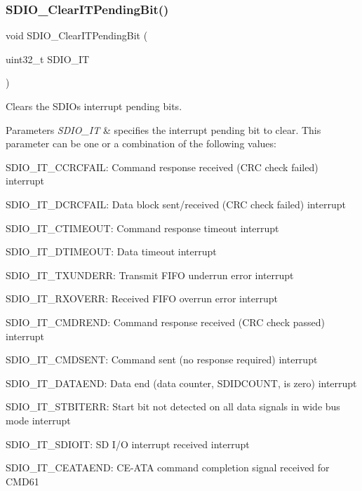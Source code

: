 \subsubsection{\texorpdfstring{SDIO\_ClearITPendingBit()}{SDIO\_ClearITPendingBit()}}
{\footnotesize\ttfamily void S\+D\+I\+O\+\_\+\+Clear\+I\+T\+Pending\+Bit (\begin{DoxyParamCaption}\item[{uint32\+\_\+t}]{S\+D\+I\+O\+\_\+\+IT }\end{DoxyParamCaption})}



Clears the S\+D\+IO\textquotesingle{}s interrupt pending bits. 


\begin{DoxyParams}{Parameters}
{\em S\+D\+I\+O\+\_\+\+IT} & specifies the interrupt pending bit to clear. This parameter can be one or a combination of the following values\+: \begin{DoxyItemize}
\item S\+D\+I\+O\+\_\+\+I\+T\+\_\+\+C\+C\+R\+C\+F\+A\+IL\+: Command response received (C\+RC check failed) interrupt \item S\+D\+I\+O\+\_\+\+I\+T\+\_\+\+D\+C\+R\+C\+F\+A\+IL\+: Data block sent/received (C\+RC check failed) interrupt \item S\+D\+I\+O\+\_\+\+I\+T\+\_\+\+C\+T\+I\+M\+E\+O\+UT\+: Command response timeout interrupt \item S\+D\+I\+O\+\_\+\+I\+T\+\_\+\+D\+T\+I\+M\+E\+O\+UT\+: Data timeout interrupt \item S\+D\+I\+O\+\_\+\+I\+T\+\_\+\+T\+X\+U\+N\+D\+E\+RR\+: Transmit F\+I\+FO underrun error interrupt \item S\+D\+I\+O\+\_\+\+I\+T\+\_\+\+R\+X\+O\+V\+E\+RR\+: Received F\+I\+FO overrun error interrupt \item S\+D\+I\+O\+\_\+\+I\+T\+\_\+\+C\+M\+D\+R\+E\+ND\+: Command response received (C\+RC check passed) interrupt \item S\+D\+I\+O\+\_\+\+I\+T\+\_\+\+C\+M\+D\+S\+E\+NT\+: Command sent (no response required) interrupt \item S\+D\+I\+O\+\_\+\+I\+T\+\_\+\+D\+A\+T\+A\+E\+ND\+: Data end (data counter, S\+D\+I\+D\+C\+O\+U\+NT, is zero) interrupt \item S\+D\+I\+O\+\_\+\+I\+T\+\_\+\+S\+T\+B\+I\+T\+E\+RR\+: Start bit not detected on all data signals in wide bus mode interrupt \item S\+D\+I\+O\+\_\+\+I\+T\+\_\+\+S\+D\+I\+O\+IT\+: SD I/O interrupt received interrupt \item S\+D\+I\+O\+\_\+\+I\+T\+\_\+\+C\+E\+A\+T\+A\+E\+ND\+: C\+E-\/\+A\+TA command completion signal received for C\+M\+D61 \end{DoxyItemize}
\\
\hline
\end{DoxyParams}

